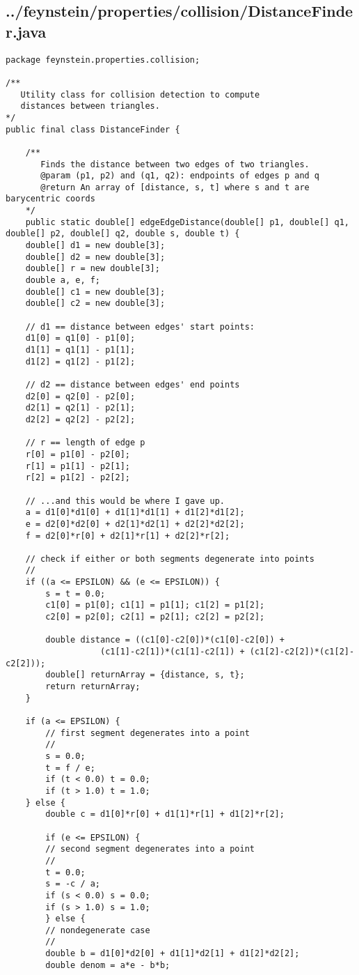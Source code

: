 \subsection*{../feynstein/properties/collision/DistanceFinder.java}
\begin{lstlisting}
package feynstein.properties.collision;

/**
   Utility class for collision detection to compute
   distances between triangles.
*/
public final class DistanceFinder {

    /**
       Finds the distance between two edges of two triangles.
       @param (p1, p2) and (q1, q2): endpoints of edges p and q
       @return An array of [distance, s, t] where s and t are barycentric coords
    */
    public static double[] edgeEdgeDistance(double[] p1, double[] q1, double[] p2, double[] q2, double s, double t) {
	double[] d1 = new double[3];
	double[] d2 = new double[3];
	double[] r = new double[3];
	double a, e, f;
	double[] c1 = new double[3];
	double[] c2 = new double[3];
	
	// d1 == distance between edges' start points:
	d1[0] = q1[0] - p1[0];
	d1[1] = q1[1] - p1[1];
	d1[2] = q1[2] - p1[2];
	
	// d2 == distance between edges' end points
	d2[0] = q2[0] - p2[0];
	d2[1] = q2[1] - p2[1];
	d2[2] = q2[2] - p2[2];

	// r == length of edge p
	r[0] = p1[0] - p2[0];
	r[1] = p1[1] - p2[1];
	r[2] = p1[2] - p2[2];
	
	// ...and this would be where I gave up.
	a = d1[0]*d1[0] + d1[1]*d1[1] + d1[2]*d1[2];
	e = d2[0]*d2[0] + d2[1]*d2[1] + d2[2]*d2[2];
	f = d2[0]*r[0] + d2[1]*r[1] + d2[2]*r[2];
	
	// check if either or both segments degenerate into points
	//
	if ((a <= EPSILON) && (e <= EPSILON)) {
	    s = t = 0.0;
	    c1[0] = p1[0]; c1[1] = p1[1]; c1[2] = p1[2];
	    c2[0] = p2[0]; c2[1] = p2[1]; c2[2] = p2[2];

	    double distance = ((c1[0]-c2[0])*(c1[0]-c2[0]) +
			       (c1[1]-c2[1])*(c1[1]-c2[1]) + (c1[2]-c2[2])*(c1[2]-c2[2]));
	    double[] returnArray = {distance, s, t};
	    return returnArray;
	}

	if (a <= EPSILON) {
	    // first segment degenerates into a point
	    //
	    s = 0.0;
	    t = f / e;
	    if (t < 0.0) t = 0.0;
	    if (t > 1.0) t = 1.0;
	} else {
	    double c = d1[0]*r[0] + d1[1]*r[1] + d1[2]*r[2];
	    
	    if (e <= EPSILON) {
		// second segment degenerates into a point
		//
		t = 0.0;
		s = -c / a;
		if (s < 0.0) s = 0.0;
		if (s > 1.0) s = 1.0;
	    } else {
		// nondegenerate case
		//
		double b = d1[0]*d2[0] + d1[1]*d2[1] + d1[2]*d2[2];
		double denom = a*e - b*b;
	    

\end{lstlisting}
